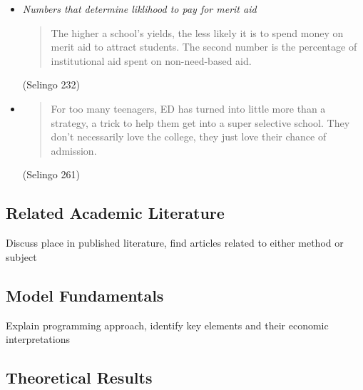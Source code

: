 \documentclass[10pt]{article}
\begin{document}
{\begin{itemize}
	\begin{quote}
	Because UW is banned by state law from considering an applicants race and ethnicity in admissions, the personal score allows creativity in improving racial diversity by using criteria that are often alternatives to race -- students' socioeconomic profiles and the hardships they have overcome. For Washington applicants, the personal score is mostly about ticking off points on the way to $9$. First-generation college students receive a point. So do low-income applicants, as well as those who note in their application that they participated in the university's array of college-prep programs, which are mostly aimed at underrepresented students. Check off all three? That's three additional points on the personal score.
	\end{quote}
	(Selingo 97)
	\item \textit{Numbers that determine liklihood to pay for merit aid}
	\begin{quote}
	The higher a school's yields, the less likely it is to spend money on merit aid to attract students. The second number is the percentage of institutional aid spent on non-need-based aid.
	\end{quote}
	(Selingo 232)
	\item {}
	\begin{quote}
	For too many teenagers, ED has turned into little more than a strategy, a trick to help them get into a super selective school. They don't necessarily love the college, they just love their chance of admission.
	\end{quote}
	(Selingo 261)
\end{itemize}}

\subsection*{Related Academic Literature}

{\color{red} Discuss place in published literature, find articles related to either method or subject}

\subsection*{Model Fundamentals}

{\color{red} Explain programming approach, identify key elements and their economic interpretations}

\subsection*{Theoretical Results}
\end{document}
